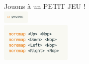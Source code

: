\documentclass[10pt]{beamer}
\begin{document}
	\begin{frame}[standout]
		Jouons à un PETIT JEU !\\
		\vspace{10pt}
		\includegraphics[width=48]{img/edit-vimrc.png}\\
		\vspace{10pt}
		\includegraphics[width=128]{img/harder.png}
	\end{frame}
\end{document}
